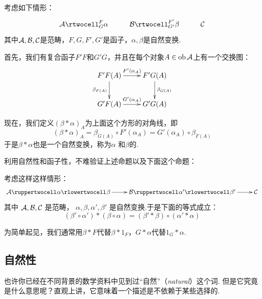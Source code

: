   \begin{prop}
    考虑如下情形：
      \begin{displaymath}
        \xymatrix{
           \Aa\rtwocell^{F}_{G}{\alpha} &\Bb\rtwocell^{F'}_{G'}{\beta} & \Cc
        }
      \end{displaymath}
    其中${\cal A},{\cal B},{\cal C}$是范畴，$F,G,F',G'$是函子，$\alpha,\beta$是自然变换.

    首先，我们有复合函子$ F' F$和$ G' G$，并且在每个对象$A\in\operatorname{ob}{\cal A}$上有一个交换图：
     \begin{displaymath}
        \xymatrix{
            F' F(A)\ar[r]^{F'(\alpha_A)}\ar[d]_{\beta_{F(A)}} &  F' G(A)\ar[d]^{\beta_{G(A)}}\\
            G' F(A)\ar[r]^{G'(\alpha_A)} &  G' G(A)
        }
    \end{displaymath}

    现在，我们定义$(\beta\ast\alpha)_A$为上面这个方形的对角线，即
    \begin{equation*}
      (\beta\ast\alpha)_A = \beta_{G(A)}\circ F'(\alpha_A) =  G'(\alpha_A)\circ\beta_{F(A)}
    \end{equation*}
    于是$\beta\ast\alpha$也是一个自然变换，称为$\alpha$ 和$\beta$的.
  \end{prop}

  利用自然性和函子性，不难验证上述命题以及下面这个命题：

  \begin{prop}
    考虑这样这样情形：
      \begin{displaymath}
        \xymatrix{
          \Aa \ruppertwocell^{}_{}{\alpha} \rlowertwocell^{}_{}{\beta} \ar[r]
          & \Bb\ruppertwocell^{}_{}{\alpha'} \rlowertwocell^{}_{}{\beta'} \ar[r]
          & \Cc
        }
      \end{displaymath}
    其中 ${\cal A},{\cal B},{\cal C}$ 是范畴， $\alpha,\beta, \alpha', \beta'$ 是自然变换.于是下面的等式成立：
    \begin{equation*}
      (\beta'\circ\alpha')\ast(\beta\circ\alpha) = (\beta'\ast\beta)\circ(\alpha'\ast\alpha)
    \end{equation*}
  \end{prop}

  为简单起见，我们通常用$\beta\ast F$代替$\beta\ast1_{F}$，$G\ast\alpha$代替$1_{G}\ast\alpha$.

\subsection{自然性}
  也许你已经在不同背景的数学资料中见到过``自然''（\emph{natural}）这个词.
  但是它究竟是什么意思呢？直观上讲，它意味着一个描述是不依赖于某些选择的.


